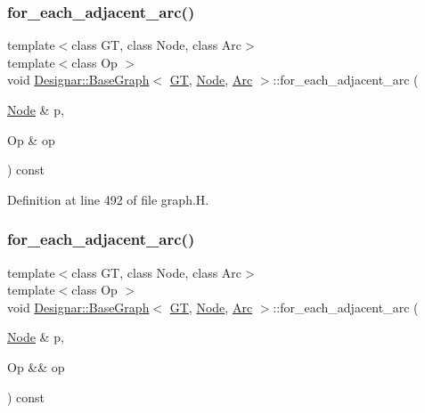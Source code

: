 \subsubsection{\texorpdfstring{for\+\_\+each\+\_\+adjacent\+\_\+arc()}{for\_each\_adjacent\_arc()}\hspace{0.1cm}{\footnotesize\ttfamily [1/2]}}
{\footnotesize\ttfamily template$<$class GT, class Node, class Arc$>$ \\
template$<$class Op $>$ \\
void \hyperlink{class_designar_1_1_base_graph}{Designar\+::\+Base\+Graph}$<$ \hyperlink{demo-buildgraph_8_c_a3001c40d2c31ca87ed96cd7d1334a55e}{GT}, \hyperlink{namespace_designar_a5af326c65aa2bd26b26c410f2030d09e}{Node}, \hyperlink{namespace_designar_a3f55fb5513d62ff47cbc8f72b8e95d6f}{Arc} $>$\+::for\+\_\+each\+\_\+adjacent\+\_\+arc (\begin{DoxyParamCaption}\item[{\hyperlink{namespace_designar_a5af326c65aa2bd26b26c410f2030d09e}{Node} \&}]{p,  }\item[{Op \&}]{op }\end{DoxyParamCaption}) const\hspace{0.3cm}{\ttfamily [inline]}}



Definition at line 492 of file graph.\+H.

\mbox{\label{class_designar_1_1_base_graph_a21553c1d96334e4cf2e0e2086e0efeba}} 
\subsubsection{\texorpdfstring{for\+\_\+each\+\_\+adjacent\+\_\+arc()}{for\_each\_adjacent\_arc()}\hspace{0.1cm}{\footnotesize\ttfamily [2/2]}}
{\footnotesize\ttfamily template$<$class GT, class Node, class Arc$>$ \\
template$<$class Op $>$ \\
void \hyperlink{class_designar_1_1_base_graph}{Designar\+::\+Base\+Graph}$<$ \hyperlink{demo-buildgraph_8_c_a3001c40d2c31ca87ed96cd7d1334a55e}{GT}, \hyperlink{namespace_designar_a5af326c65aa2bd26b26c410f2030d09e}{Node}, \hyperlink{namespace_designar_a3f55fb5513d62ff47cbc8f72b8e95d6f}{Arc} $>$\+::for\+\_\+each\+\_\+adjacent\+\_\+arc (\begin{DoxyParamCaption}\item[{\hyperlink{namespace_designar_a5af326c65aa2bd26b26c410f2030d09e}{Node} \&}]{p,  }\item[{Op \&\&}]{op }\end{DoxyParamCaption}) const\hspace{0.3cm}{\ttfamily [inline]}}



